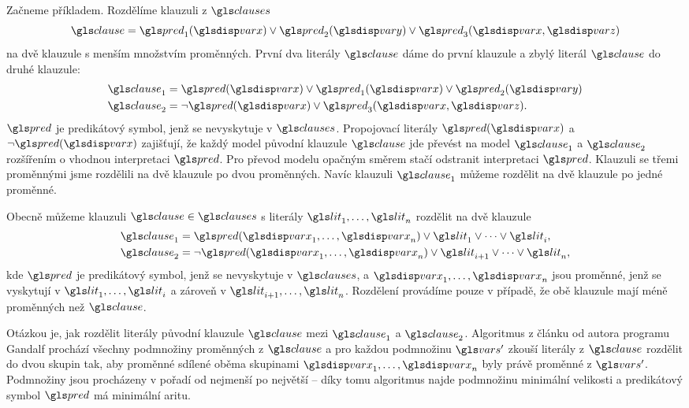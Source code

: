 Začneme příkladem. Rozdělíme klauzuli z $\clauses$
\[
\clause = \pred_1(\var) \vee \pred_2(\varY) \vee \pred_3(\var, \varZ)
\]
na dvě klauzule s menším množstvím proměnných.
První dva literály $\clause$ dáme do první klauzule
a zbylý literál $\clause$ do druhé klauzule:
\begin{align*}
  \clause_1 &= \pred(\var) \vee \pred_1(\var) \vee \pred_2(\varY) \\
  \clause_2 &= \neg \pred(\var) \vee \pred_3(\var, \varZ).
\end{align*}
$\pred$ je predikátový symbol, jenž se nevyskytuje v $\clauses$.
Propojovací literály $\pred(\var)$ a $\neg \pred(\var)$ zajišťují,
že každý model původní klauzule $\clause$ jde převést na model
$\clause_1$ a $\clause_2$ rozšířením o vhodnou interpretaci $\pred$.
Pro převod modelu opačným směrem stačí odstranit interpretaci $\pred$.
Klauzuli se třemi proměnnými jsme rozdělili na dvě klauzule po dvou
proměnných. Navíc klauzuli $\clause_1$ můžeme rozdělit
na dvě klauzule po jedné proměnné.

Obecně můžeme klauzuli $\clause \in \clauses$ s literály
$\lit_1 \comdots \lit_n$ rozdělit na dvě klauzule
\begin{align*}
  \clause_1 &= \pred(\var_1 \comdots \var_n) \vee
    \lit_1 \vee \cdots \vee \lit_i, \\
  \clause_2 &= \neg \pred(\var_1 \comdots \var_n) \vee
    \lit_{i+1} \vee \cdots \vee \lit_n,
\end{align*}
kde $\pred$ je predikátový symbol, jenž se nevyskytuje v $\clauses$,
a $\var_1 \comdots \var_n$ jsou proměnné, jenž se vyskytují v
$\lit_1 \comdots \lit_i$ a zároveň v $\lit_{i+1} \comdots \lit_n$.
Rozdělení provádíme pouze v případě, že obě klauzule mají
méně proměnných než $\clause$.

Otázkou je, jak rozdělit literály původní klauzule $\clause$ mezi
$\clause_1$ a $\clause_2$. Algoritmus z článku \cite{tammet03}
od autora programu Gandalf prochází všechny podmnožiny
proměnných z $\clause$ a pro každou podmnožinu $\vars'$
zkouší literály z $\clause$ rozdělit do dvou skupin tak,
aby proměnné sdílené oběma skupinami $\var_1 \comdots \var_n$
byly právě proměnné z $\vars'$. Podmnožiny jsou procházeny
v pořadí od nejmenší po největší -- díky tomu algoritmus
najde podmnožinu minimální velikosti
a predikátový symbol $\pred$ má minimální aritu.


